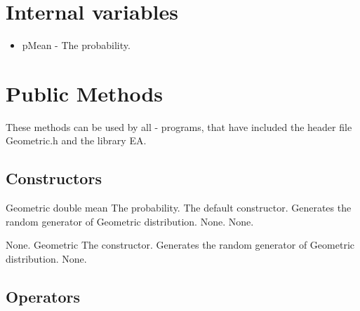 \clearpage

\section{Internal variables}

\begin{itemize}
\item {pMean - The probability.}
\end{itemize}


\vspace*{10mm}

\section{Public Methods}

\noindent
These methods can be used by all \cpp - programs, that have included the
header file Geometric.h and the library EA.

\subsection{Constructors}

\setNormalInstance
\printMethodWithOneParam
{}
{Geometric}
{double}
{mean}
{The probability.}
{The default constructor. Generates the random generator of Geometric distribution.}
{None.}
{None.}

\setNormalInstance
\setCorrectWidthThree{8pt}
\printMethodWithParamsSaved
{}
{None.}
{Geometric}
{The constructor. Generates the random generator of Geometric distribution.}
{None.}
\setCorrectWidthThree{4pt}

\vspace*{10mm}

\subsection{Operators}

